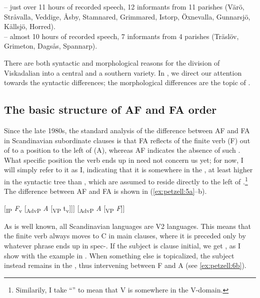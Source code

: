 \documentclass[output=paper,colorlinks,citecolor=brown,draft,draftmode]{langscibook}
\begin{document}
\ea\label{ex:petzell:4}
\ea  {} – just over 11 hours of recorded speech, 12 informants from 11 parishes (Värö, Stråvalla, Veddige, Åsby, Stamnared, Grimmared, Istorp, Öxnevalla, Gunnarsjö, Källsjö, Horred).  \\
\ex\label{ex:petzell:4b}   – almost 10 hours of recorded speech, 7 informants from 4 parishes (Träslöv, Grimeton, Dagsås, Spannarp).
\z
\z


There are both syntactic and morphological reasons for the division of Viskadalian into a central and a southern variety. In , we direct our attention towards the syntactic differences; the morphological differences are the topic of .


\subsection{The basic structure of AF and FA order}\label{sec:petzell:2.2}


Since the late 1980s, the standard analysis of the difference between AF and FA in Scandinavian subordinate clauses is that FA reflects  of the finite verb (F) out of  to a position to the left of  (A), whereas AF indicates the absence of such . What specific position the verb ends up in need not concern us yet; for now, I will simply refer to it as I, indicating that it is somewhere in the , at least higher in the syntactic tree than , which are assumed to reside directly to the left of .\footnote{Similarily, I take “” to mean that V is somewhere in the V-domain.} The difference between AF and FA is shown in (\ref{ex:petzell:5a}–b).


\ea\label{ex:petzell:5}
\ea\label{ex:petzell:5a}
[\textsubscript{IP} \textit{F}\textsubscript{v} [\textsubscript{AdvP} \textit{A} [\textsubscript{VP} t\textsubscript{v}]]]                      
\ex\label{ex:petzell:5b}{}  [\textsubscript{AdvP} \textit{A} [\textsubscript{VP} \textit{F}]]                        
\z
\z


As is well known, all Scandinavian languages are V2 languages. This means that the finite verb always moves to C in main clauses, where it is preceded only by whatever phrase ends up in spec-. If the subject is clause initial, we get , as I show with the  example in . When something else is topicalized, the subject instead remains in the , thus intervening between F and A (see \ref{ex:petzell:6b}).
\end{document}
